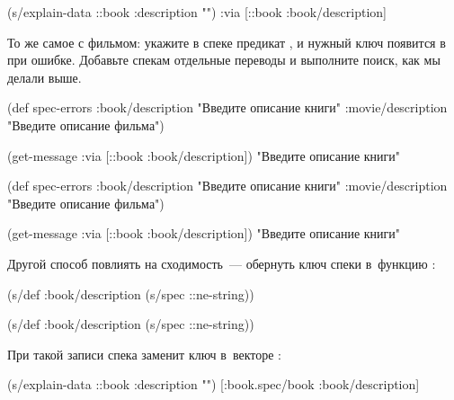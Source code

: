 \else


\begin{clojure}
(s/explain-data ::book {:description ""})
{:via [::book :book/description]}
\end{clojure}


\fi

То же самое с фильмом: укажите в спеке  предикат
, и нужный ключ появится в  при ошибке. Добавьте
спекам отдельные переводы и выполните поиск, как мы делали выше.

\pagebreaklarge

\ifnarrow

\begin{clojure}
(def spec-errors
  {:book/description
   "Введите описание книги"
   :movie/description
   "Введите описание фильма"})

(get-message
  {:via [::book :book/description]})
"Введите описание книги"
\end{clojure}

\else

\begin{clojure}
(def spec-errors
  {:book/description "Введите описание книги"
   :movie/description "Введите описание фильма"})

(get-message {:via [::book :book/description]})
"Введите описание книги"
\end{clojure}

\fi

Другой способ повлиять на сходимость~--- обернуть ключ спеки в~функцию
:

\ifnarrow


\begin{clojure}
(s/def :book/description
  (s/spec ::ne-string))
\end{clojure}


\else


\begin{clojure}
(s/def :book/description (s/spec ::ne-string))
\end{clojure}


\fi

При такой записи спека  заменит ключ 
в~векторе :

\ifnarrow


\begin{clojure}
(s/explain-data ::book
  {:description ""})
[:book.spec/book :book/description]
\end{clojure}


